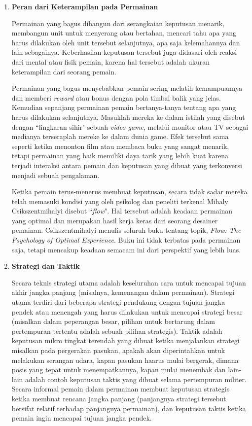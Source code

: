 \begin{enumerate}[label=\textbf{\alph*).}]
	
	\item \textbf{Peran dari Keterampilan pada Permainan}
	\setlength{\parindent}{0.8cm}
	
	Permainan yang bagus dibangun dari serangkaian keputusan menarik, membangun unit untuk menyerang atau bertahan, mencari tahu apa yang harus dilakukan oleh unit tersebut selanjutnya, apa saja kelemahannya dan lain sebagainya. Keberhasilan keputusan tersebut juga didasari oleh reaksi dari mental atau fisik pemain, karena hal tersebut adalah ukuran keterampilan dari seorang pemain.
	\vspace{1ex}

	Permainan yang bagus menyebabkan pemain sering melatih kemampuannya dan memberi \textit{reward} atau bonus dengan pola timbal balik yang jelas. Kemudian sepanjang permainan pemain bertanya-tanya tentang apa yang harus dilakukan selanjutnya. Masuklah mereka ke dalam istilah yang disebut dengan ``lingkaran sihir" sebuah \textit{video game}, melalui monitor atau TV sebagai medianya terseraplah mereke ke dalam dunia game. Efek tersebut sama seperti ketika menonton film atau membaca buku yang sangat menarik, tetapi permainan yang baik memiliki daya tarik yang lebih kuat karena terjadi interaksi antara pemain dan keputusan yang dibuat yang terkonversi menjadi sebuah pengalaman.
	\vspace{1ex}
	
	Ketika pemain terus-menerus membuat keputusan, secara tidak sadar mereka telah memasuki kondisi yang oleh psikolog dan peneliti terkenal Mihaly Csikszentmihalyi disebut ``\textit{flow}". Hal tersebut adalah keadaan permainan yang optimal dan merupakan hasil kerja keras dari seorang desainer pemainan. Csikszentmihalyi menulis seluruh buku tentang topik, \textit{Flow: The Psychology of Optimal Experience}. Buku ini tidak terbatas pada permainan saja, tetapi mencakup keadaan semacam ini dari perspektif yang lebih luas.
	
	\item \textbf{Strategi dan Taktik}
	
	Secara teknis strategi utama adalah keseluruhan cara untuk mencapai tujuan akhir jangka panjang (misalnya, kemenangan dalam permainan). Strategi utama terdiri dari beberapa strategi pendukung dengan tujuan jangka pendek atau menengah yang harus dilakukan untuk mencapai strategi besar (misalkan dalam peperangan besar, pilihan untuk bertarung dalam pertempuran tertentu adalah sebuah pilihan strategis). Taktik adalah keputusan mikro tingkat terendah yang dibuat ketika menjalankan strategi misalkan pada pergerakan pasukan, apakah akan diperintahkan untuk melakukan serangan udara, kapan pasukan haarus mulai bergerak, dimana posis yang tepat untuk menempatkannya, kapan mulai menembak dan lain-lain adalah contoh keputusan taktis yang dibuat selama pertempuran militer. Secara informal pemain dalam permainan membuat keputusan strategis ketika membuat rencana jangka panjang (panjangnya strategi tersebut bersifat relatif terhadap panjangnya permainan), dan keputusan taktis ketika pemain ingin mencapai tujuan jangka pendek.
	\vspace{1ex}
	

\end{enumerate}
